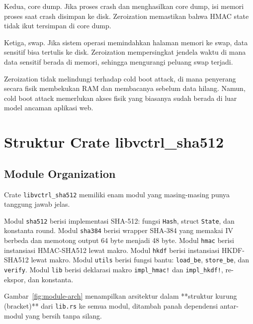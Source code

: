 \documentclass[11pt,a4paper]{article}
\begin{document}
Kedua, core dump. Jika proses crash dan menghasilkan core dump, isi memori proses saat crash disimpan ke disk. Zeroization memastikan bahwa HMAC state tidak ikut tersimpan di core dump.

Ketiga, swap. Jika sistem operasi memindahkan halaman memori ke swap, data sensitif bisa tertulis ke disk. Zeroization mempersingkat jendela waktu di mana data sensitif berada di memori, sehingga mengurangi peluang swap terjadi.

Zeroization tidak melindungi terhadap cold boot attack, di mana penyerang secara fisik membekukan RAM dan membacanya sebelum data hilang. Namun, cold boot attack memerlukan akses fisik yang biasanya sudah berada di luar model ancaman aplikasi web.

\section{Struktur Crate libvctrl\_sha512}

\subsection{Module Organization}

Crate \texttt{libvctrl\_sha512} memiliki enam modul yang masing-masing punya tanggung jawab jelas.

Modul \texttt{sha512} berisi implementasi SHA-512: fungsi \texttt{Hash}, struct \texttt{State}, dan konstanta round. Modul \texttt{sha384} berisi wrapper SHA-384 yang memakai IV berbeda dan memotong output 64 byte menjadi 48 byte. Modul \texttt{hmac} berisi instansiasi HMAC-SHA512 lewat makro. Modul \texttt{hkdf} berisi instansiasi HKDF-SHA512 lewat makro. Modul \texttt{utils} berisi fungsi bantu: \texttt{load\_be}, \texttt{store\_be}, dan \texttt{verify}. Modul \texttt{lib} berisi deklarasi makro \texttt{impl\_hmac!} dan \texttt{impl\_hkdf!}, re-ekspor, dan konstanta.

Gambar~\ref{fig:module-arch} menampilkan arsitektur dalam **struktur kurung (bracket)** dari \texttt{lib.rs} ke semua modul, ditambah panah dependensi antar-modul yang bersih tanpa silang.
\end{document}
